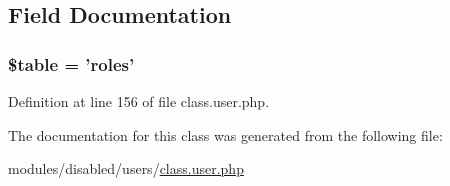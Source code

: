 \subsection{Field Documentation}
\hypertarget{class_role_ae8876a14058f368335baccf35af4a22b}{
\subsubsection[{\$table}]{\setlength{\rightskip}{0pt plus 5cm}\$table = 'roles'}}\label{class_role_ae8876a14058f368335baccf35af4a22b}


Definition at line 156 of file class.\-user.\-php.



The documentation for this class was generated from the following file\-:\begin{DoxyCompactItemize}
\item 
modules/disabled/users/\hyperlink{class_8user_8php}{class.\-user.\-php}\end{DoxyCompactItemize}
